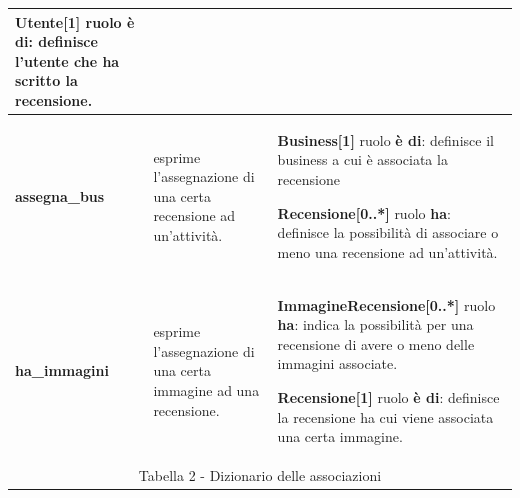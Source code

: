 \documentclass[a4paper,12pt]{article}
\begin{document}
\begin{flushleft}
\begin{table}[htbp]
\begin{tabular}[c]{| m{3cm} | m{5cm} | m{7cm} |}
{\bf Utente[1]} ruolo {\bf è di}: definisce l'utente che ha scritto la
recensione.
\\
\hline

{\bf assegna\_bus}
&\small esprime l'assegnazione di una certa recensione ad un'attività.
&\footnotesize
{\bf Business[1]} ruolo {\bf è di}: definisce il business a cui è
associata la recensione

{\bf Recensione[0..*]} ruolo {\bf ha}: definisce la possibilità di associare o meno una recensione ad un'attività.
\\
\hline

{\bf ha\_immagini}
&\small esprime l'assegnazione di una certa immagine ad una recensione.
&\footnotesize
{\bf ImmagineRecensione[0..*]} ruolo {\bf ha}: indica la possibilità per 
una recensione di avere o meno delle immagini associate.

{\bf Recensione[1]} ruolo {\bf è di}: definisce la recensione ha cui viene
associata una certa immagine.
\\
\hline
\multicolumn{3}{c}{\footnotesize{\normalsize Tabella 2 - Dizionario delle associazioni}}
\end{tabular}
\end{table}
\end{flushleft}
\newpage
\end{document}
